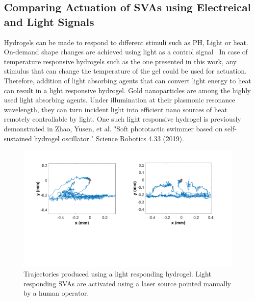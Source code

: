 \subsection{Comparing Actuation of SVAs using Electreical and Light Signals}
Hydrogels can be made to respond to different stimuli such as PH, Light or heat. On-demand shape changes are achieved using light as a control signal~\cite{Wang2015b} In case of temperature responsive hydrogels such as the one presented in this work, any stimulus that can change the temperature of the gel could be used for actuation. Therefore, addition of light absorbing agents that can convert light energy to heat can result in a light responsive hydrogel. Gold nanoparticles are among the highly used light absorbing agents. Under illumination at their plasmonic resonance wavelength, they can turn incident light into efficient nano sources of heat remotely controllable by light. One such light responsive hydrogel is previously demonstrated in {Zhao, Yusen, et al. "Soft phototactic swimmer based on self-sustained hydrogel oscillator." Science Robotics 4.33 (2019).}
\begin{figure}[!th]
      \centering
      \includegraphics[width=1\textwidth]{Fig4.pdf}
      \caption[Trajectories using a light responding hydrogel]{Trajectories produced using a light responding hydrogel. Light responding SVAs are activated using a laser source pointed manually by a human operator.}
      \label{fig:laser}
\end{figure}
